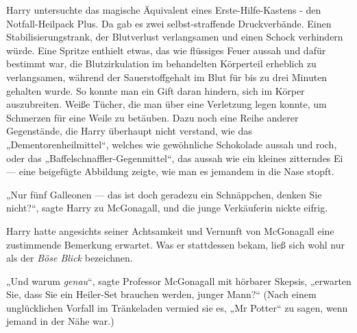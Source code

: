 {Harry untersuchte das magische Äquivalent eines Erste-Hilfe-Kastens - den Notfall-Heilpack Plus. Da gab es zwei selbst-straffende Druckverbände. Einen Stabilisierungstrank, der Blutverlust verlangsamen und einen Schock verhindern würde. Eine Spritze enthielt etwas, das wie flüssiges Feuer aussah und dafür bestimmt war, die Blutzirkulation im behandelten Körperteil erheblich zu verlangsamen, während der Sauerstoffgehalt im Blut für bis zu drei Minuten gehalten wurde. So konnte man ein Gift daran hindern, sich im Körper auszubreiten. Weiße Tücher, die man über eine Verletzung legen konnte, um Schmerzen für eine Weile zu betäuben. Dazu noch eine Reihe anderer Gegenstände, die Harry überhaupt nicht verstand, wie das „Dementorenheilmittel“, welches wie gewöhnliche Schokolade aussah und roch, oder das „Baffelschnaffler-Gegenmittel“, das aussah wie ein kleines zitterndes Ei --- eine beigefügte Abbildung zeigte, wie man es jemandem in die Nase stopft.

„Nur fünf Galleonen --- das ist doch geradezu ein Schnäppchen, denken Sie nicht?“, sagte Harry zu McGonagall, und die junge Verkäuferin nickte eifrig.

Harry hatte angesichts seiner Achtsamkeit und Vernunft von McGonagall eine zustimmende Bemerkung erwartet. Was er stattdessen bekam, ließ sich wohl nur als der \emph{Böse Blick} bezeichnen.

„Und warum \emph{genau}“, sagte Professor McGonagall mit hörbarer Skepsis, „erwarten Sie, dass Sie ein Heiler-Set brauchen werden, junger Mann?“ (Nach einem unglücklichen Vorfall im Tränkeladen vermied sie es, „Mr Potter“ zu sagen, wenn jemand in der Nähe war.)

}
